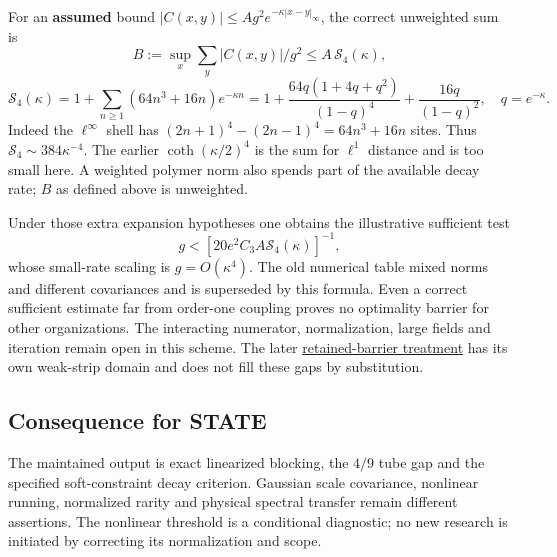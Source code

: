 \documentclass[11pt,a4paper]{article}
\begin{document}
For an \textbf{assumed} bound
\(|C(x,y)|\le Ag^2e^{-\kappa|x-y|_\infty}\), the correct unweighted sum
is \[B:=\sup_x\sum_y|C(x,y)|/g^2\le A\,\mathcal S_4(\kappa),\]
\[\mathcal S_4(\kappa)
=1+\sum_{n\ge1}(64n^3+16n)e^{-\kappa n}
=1+\frac{64q(1+4q+q^2)}{(1-q)^4}+\frac{16q}{(1-q)^2},\quad q=e^{-\kappa}.\]
Indeed the \(\ell^\infty\) shell has \((2n+1)^4-(2n-1)^4=64n^3+16n\)
sites. Thus \(\mathcal S_4\sim384\kappa^{-4}\). The earlier
\(\coth(\kappa/2)^4\) is the sum for \(\ell^1\) distance and is too
small here. A weighted polymer norm also spends part of the available
decay rate; \(B\) as defined above is unweighted.

Under those extra expansion hypotheses one obtains the illustrative
sufficient test \[g<[20e^2C_3A\mathcal S_4(\kappa)]^{-1},\] whose
small-rate scaling is \(g=O(\kappa^4)\). The old numerical table mixed
norms and different covariances and is superseded by this formula. Even
a correct sufficient estimate far from order-one coupling proves no
optimality barrier for other organizations. The interacting numerator,
normalization, large fields and iteration remain open in this scheme.
The later \href{su2-midplane-small-field.md}{retained-barrier treatment}
has its own weak-strip domain and does not fill these gaps by
substitution.

\hypertarget{consequence-for-state}{%
\subsection{Consequence for STATE}\label{consequence-for-state}}

The maintained output is exact linearized blocking, the \(4/9\) tube gap
and the specified soft-constraint decay criterion. Gaussian scale
covariance, nonlinear running, normalized rarity and physical spectral
transfer remain different assertions. The nonlinear threshold is a
conditional diagnostic; no new research is initiated by correcting its
normalization and scope.
\end{document}
